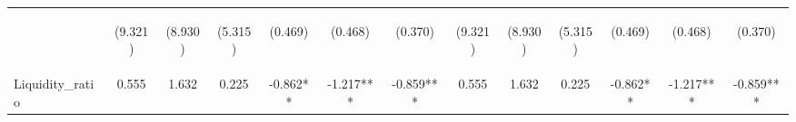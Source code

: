 \documentclass[]{article}
\begin{document}
\begin{center}
\begin{tabular}{lcccccccccccc}
\vspace{4pt} & \begin{footnotesize}(9.321)\end{footnotesize} & \begin{footnotesize}(8.930)\end{footnotesize} & \begin{footnotesize}(5.315)\end{footnotesize} & \begin{footnotesize}(0.469)\end{footnotesize} & \begin{footnotesize}(0.468)\end{footnotesize} & \begin{footnotesize}(0.370)\end{footnotesize} & \begin{footnotesize}(9.321)\end{footnotesize} & \begin{footnotesize}(8.930)\end{footnotesize} & \begin{footnotesize}(5.315)\end{footnotesize} & \begin{footnotesize}(0.469)\end{footnotesize} & \begin{footnotesize}(0.468)\end{footnotesize} & \begin{footnotesize}(0.370)\end{footnotesize} \\
Liquidity\_ratio & 0.555 & 1.632 & 0.225 & -0.862** & -1.217*** & -0.859*** & 0.555 & 1.632 & 0.225 & -0.862** & -1.217*** & -0.859*** \\

\end{tabular}
\end{center}
\end{document}
